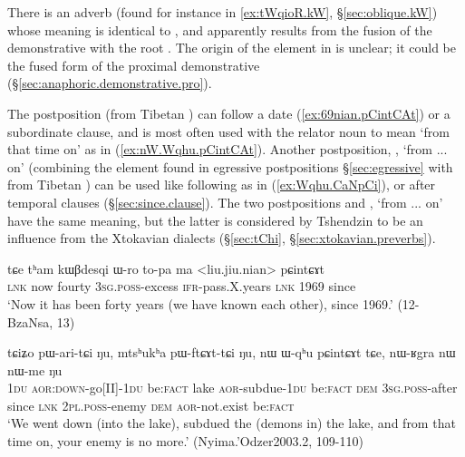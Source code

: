 There is an adverb  (found for instance in \ref{ex:tWqioR.kW}, §\ref{sec:oblique.kW}) whose meaning is identical to , and apparently results from the fusion of the demonstrative  with the root . The origin of the  element in  is unclear; it could be the fused form of the proximal demonstrative  (§\ref{sec:anaphoric.demonstrative.pro}).

The postposition  (from Tibetan ) can follow a date (\ref{ex:69nian.pCintCAt}) or a subordinate clause, and is most often used with the relator noun  to mean `from that time on' as in (\ref{ex:nW.Wqhu.pCintCAt}). Another postposition,  , `from ... on' (combining the  element found in egressive postpositions §\ref{sec:egressive}  with  from Tibetan ) can be used like  following   as in (\ref{ex:Wqhu.CaNpCi}), or after temporal clauses (§\ref{sec:since.clause}). The two postpositions  and , `from ... on' have the same meaning, but the latter is considered by Tshendzin to be an influence from the Xtokavian dialects (§\ref{sec:tChi}, §\ref{sec:xtokavian.preverbs}).

 \begin{exe}
\ex \label{ex:69nian.pCintCAt}
 \gll tɕe tʰam kɯβdesqi ɯ-ro to-pa ma <liu.jiu.nian> pɕintɕɤt \\
 \textsc{lnk} now fourty \textsc{3sg}.\textsc{poss}-excess \textsc{ifr}-pass.X.years \textsc{lnk}  1969 since \\
 \glt `Now it has been forty years (we have known each other), since 1969.' (12-BzaNsa, 13)
 \end{exe}
 
  \begin{exe}
\ex \label{ex:nW.Wqhu.pCintCAt}
 \gll  tɕiʑo pɯ-ari-tɕi ŋu, mtsʰukʰa pɯ-ftɕɤt-tɕi ŋu, nɯ ɯ-qʰu pɕintɕɤt tɕe,  nɯ-ʁgra nɯ nɯ-me ŋu \\
 \textsc{1du} \textsc{aor}:\textsc{down}-go[II]-\textsc{1du} be:\textsc{fact} lake \textsc{aor}-subdue-\textsc{1du} be:\textsc{fact} \textsc{dem} \textsc{3sg}.\textsc{poss}-after since \textsc{lnk} \textsc{2pl}.\textsc{poss}-enemy \textsc{dem} \textsc{aor}-not.exist be:\textsc{fact} \\
 \glt `We went down (into the lake), subdued the (demons in) the lake, and from that time on, your enemy is no more.' (Nyima.'Odzer2003.2, 109-110)
 \end{exe}
 
